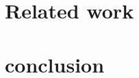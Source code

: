 \documentclass[runningheads]{llncs}
\begin{document}










\section{Related work}
\label{sec:related}

\section{conclusion}
\label{sec:conclusion}





\end{document}
